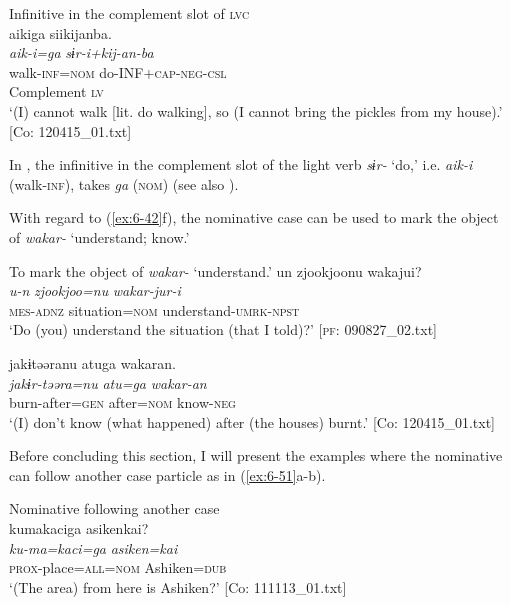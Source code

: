 \ea\label{ex:6-49}
 Infinitive in the complement slot of \textsc{lvc}\\

{\TM}
\gllll aikiga  siikijanba.\\
\textit{aik-i=ga}  \textit{sɨr-i+kij-an-ba}\\
    walk-\textsc{inf}=\textsc{nom}  do-INF+\textsc{cap}-\textsc{neg}-\textsc{csl}\\
    Complement  \textsc{lv}\\
\glt    ‘(I) cannot walk [lit. do walking], so (I cannot bring the pickles from my house).’
  [Co: 120415\_01.txt]
\z

In , the infinitive in the complement slot of the light verb \textit{sɨr-} ‘do,’ i.e. \textit{aik-i} (walk-\textsc{inf}), takes \textit{ga} (\textsc{nom}) (see also ).

  With regard to (\ref{ex:6-42}f), the nominative case can be used to mark the object of \textit{wakar-} ‘understand; know.’

\ea\label{ex:6-50}
  To mark the object of \textit{wakar-} ‘understand.’
 \ea
 {\TM}
\glll  un  {\textbar}zjookjoo{\textbar}nu  wakajui?\\
\textit{u-n}  \textit{zjookjoo=nu}  \textit{wakar-jur-i}\\
\textsc{mes}-\textsc{adnz}  situation=\textsc{nom}  understand-\textsc{umrk}-\textsc{npst}\\
\glt ‘Do (you) understand the situation (that I told)?’ [\textsc{pf}: 090827\_02.txt]

\ex
{\TM}
\glll jakɨtəəranu  atuga  wakaran.\\
\textit{jakɨr-təəra=nu}  \textit{atu=ga}  \textit{wakar-an}\\
burn-after=\textsc{gen}  after=\textsc{nom}  know-\textsc{neg}\\
\glt ‘(I) don’t know (what happened) after (the houses) burnt.’ [Co: 120415\_01.txt]
\z
\z

  Before concluding this section, I will present the examples where the nominative can follow another case particle as in (\ref{ex:6-51}a-b).

\ea\label{ex:6-51}
 Nominative following another case\\

 \ea
 {\TM}
\glll  kumakaciga  asikenkai?\\
\textit{ku-ma=kaci=ga}  \textit{asiken=kai}\\
\textsc{prox}-place=\textsc{all}=\textsc{nom}  Ashiken=\textsc{dub}\\
\glt ‘(The area) from here is Ashiken?’ [Co: 111113\_01.txt]

